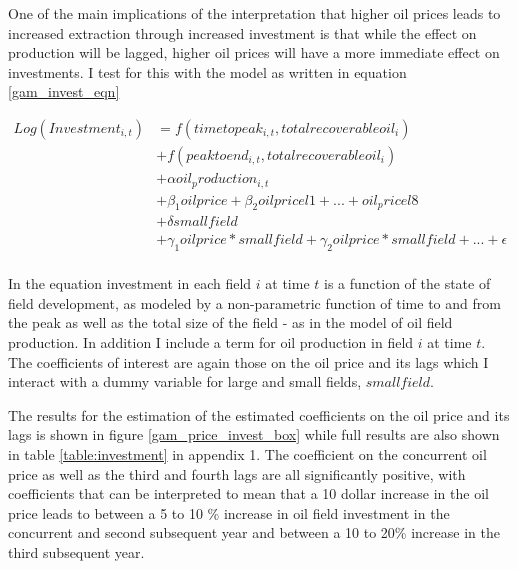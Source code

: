 \documentclass[12pt]{article}
\begin{document}
One of the main implications of the interpretation that higher oil prices leads to increased extraction through increased investment is that while the effect on production will be lagged, higher oil prices will have a more immediate effect on investments.  I test for this with the model as written in equation \ref{gam_invest_eqn}

\begin{equation}
\begin{split}
	Log(Investment_{i,t})&=f(timetopeak_{i,t}, totalrecoverableoil_i) \\
	 \quad &+ f(peaktoend_{i,t}, totalrecoverableoil_i) \\
	 \quad &+ \alpha oil_production_{i,t} \\
	 \quad & + \beta_1 oilprice + \beta_2 oilpricel1 + ... + oil_pricel8 \\
	 \quad &+ \delta smallfield \\
	 \quad &+ \gamma_1 oilprice*smallfield + \gamma_2 oilprice*smallfield + ... 
	+  \epsilon \\
\label{gam_invest_eqn}
\end{split}
\end{equation}

In the equation investment in each field $i$ at time $t$ is a function of the state of field development, as modeled by a non-parametric function of time to and from the peak as well as the total size of the field - as in the model of oil field production.  In addition I include a term for oil production in field $i$ at time $t$.  The coefficients of interest are again those on the oil price and its lags which I interact with a dummy variable for large and small fields, $smallfield$.

The results for the estimation of the estimated coefficients on the oil price and its lags is shown in figure \ref{gam_price_invest_box} while full results are also shown in table \ref{table:investment} in appendix 1.  The coefficient on the concurrent oil price as well as the third and fourth lags are all significantly positive, with coefficients that can be interpreted to mean that a 10 dollar increase in the oil price leads to between a 5 to 10 \% increase in oil field investment in the concurrent and second subsequent year and between a 10 to 20\% increase in the third subsequent year.  
\end{document}
